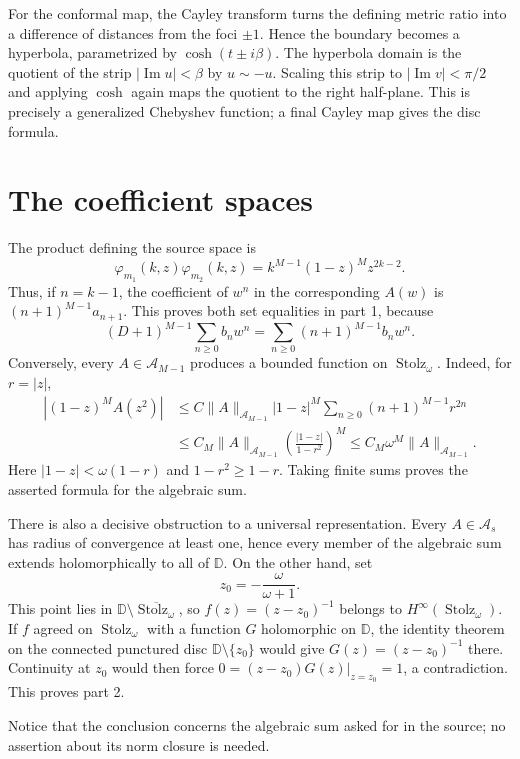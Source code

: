 \documentclass[11pt]{article}
\newcommand{\D}{\mathbb D}
\newcommand{\St}{\operatorname{Stolz}}
\newcommand{\Hinfty}{H^\infty}
\begin{document}
For the conformal map, the Cayley transform turns the defining metric ratio
into a difference of distances from the foci $\pm1$.  Hence the boundary
becomes a hyperbola, parametrized by $\cosh(t\pm i\beta)$.  The hyperbola
domain is the quotient of the strip $|\operatorname{Im}u|<\beta$ by
$u\sim-u$.  Scaling this strip to $|\operatorname{Im}v|<\pi/2$ and applying
$\cosh$ again maps the quotient to the right half-plane.  This is precisely a
generalized Chebyshev function; a final Cayley map gives the disc formula.

\section{The coefficient spaces}

The product defining the source space is
\begin{equation}
 \varphi_{m_1}(k,z)\varphi_{m_2}(k,z)
 =k^{M-1}(1-z)^M z^{2k-2}.
 \label{eq:product}
\end{equation}
Thus, if $n=k-1$, the coefficient of $w^n$ in the corresponding $A(w)$
is $(n+1)^{M-1}a_{n+1}$.  This proves both set equalities in part 1,
because
\[
 (D+1)^{M-1}\sum_{n\geq0}b_nw^n
 =\sum_{n\geq0}(n+1)^{M-1}b_nw^n.
\]
Conversely, every $A\in\mathcal A_{M-1}$ produces a bounded function on
$\St_\omega$.  Indeed, for $r=|z|$,
\begin{align*}
 |(1-z)^MA(z^2)|
 &\leq C\|A\|_{\mathcal A_{M-1}}|1-z|^M
        \sum_{n\geq0}(n+1)^{M-1}r^{2n}\\
 &\leq C_M\|A\|_{\mathcal A_{M-1}}
       \left(\frac{|1-z|}{1-r^2}\right)^M
 \leq C_M\omega^M\|A\|_{\mathcal A_{M-1}}.
\end{align*}
Here $|1-z|<\omega(1-r)$ and $1-r^2\geq1-r$.
Taking finite sums proves the asserted formula for the algebraic sum.

There is also a decisive obstruction to a universal representation.  Every
$A\in\mathcal A_s$ has radius of convergence at least one, hence every
member of the algebraic sum extends holomorphically to all of $\D$.  On the
other hand, set
\[
 z_0=-\frac{\omega}{\omega+1}.
\]
This point lies in $\D\setminus\overline{\St_\omega}$, so
$f(z)=(z-z_0)^{-1}$ belongs to $\Hinfty(\St_\omega)$.  If $f$ agreed on
$\St_\omega$ with a function $G$ holomorphic on $\D$, the identity theorem
on the connected punctured disc $\D\setminus\{z_0\}$ would give
$G(z)=(z-z_0)^{-1}$ there.  Continuity at $z_0$ would then force
$0=(z-z_0)G(z)|_{z=z_0}=1$, a contradiction.  This proves part 2.

Notice that the conclusion concerns the algebraic sum asked for in the
source; no assertion about its norm closure is needed.
\end{document}
